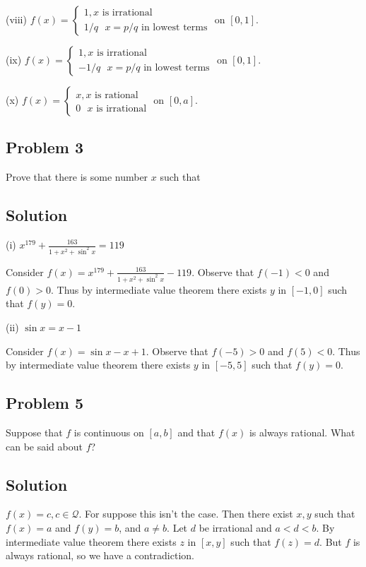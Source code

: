 \vs

(viii) $f(x)=\begin{cases}
  1, \text{$x$ is irrational}\\
  1/q \ \ \ x=p/q \text{ in lowest terms}
\end{cases}$ on $[0, 1]$.

\vs

(ix) $f(x)=\begin{cases}
  1, \text{$x$ is irrational}\\
  -1/q \ \ \ x=p/q \text{ in lowest terms}
\end{cases}$ on $[0, 1]$.

\vs

(x) $f(x)=\begin{cases}
  x, \text{$x$ is rational}\\
  0 \ \ \ \text{$x$ is irrational}
\end{cases}$ on $[0, a]$.


\subsection*{Problem 3}
Prove that there is some number $x$ such that

\subsection*{Solution}
(i) $x^{179}+\frac{163}{1+x^{2}+\sin^{2} x}=119$

\vs

Consider $f(x)=x^{179}+\frac{163}{1+x^{2}+\sin^{2} x}-119$. Observe
that $f(-1)<0$ and $f(0)>0$. Thus by intermediate value theorem there
exists $y$ in $[-1,0]$ such that $f(y)=0$.

\vs

(ii) $\sin x = x-1$

\vs

Consider $f(x)=\sin x-x+1$. Observe that $f(-5)>0$ and $f(5)<0$. Thus
by intermediate value theorem there exists $y$ in $[-5,5]$ such that
$f(y)=0$.

\subsection*{Problem 5}
Suppose that $f$ is continuous on $[a,b]$ and that $f(x)$ is always
rational. What can be said about $f$?

\subsection*{Solution}
$f(x)=c, c\in\mathcal{Q}$. For suppose this isn't the case. Then there exist
$x,y$ such that $f(x)=a$ and $f(y)=b$, and $a\neq b$. Let $d$ be
irrational and $a<d<b$. By intermediate value theorem there exists $z$
in $[x, y]$ such that $f(z)=d$. But $f$ is always rational, so we have
a contradiction.

